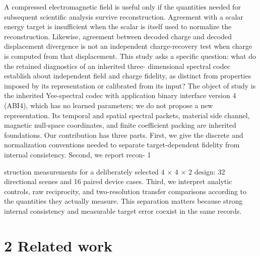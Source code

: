 \documentclass[11pt]{article}
\begin{document}
A compressed electromagnetic field is useful only if the quantities needed for subsequent scientific
analysis survive reconstruction. Agreement with a scalar energy target is insufficient when the
scalar is itself used to normalize the reconstruction. Likewise, agreement between decoded charge
and decoded displacement divergence is not an independent charge-recovery test when charge is
computed from that displacement.
This study asks a specific question: what do the retained diagnostics of an inherited three-
dimensional spectral codec establish about independent field and charge fidelity, as distinct from
properties imposed by its representation or calibrated from its input? The object of study is
the inherited Yee-spectral codec with application binary interface version 4 (ABI4), which has no
learned parameters; we do not propose a new representation. Its temporal and spatial spectral
packets, material side channel, magnetic null-space coordinates, and finite coefficient packing are
inherited foundations.
Our contribution has three parts. First, we give the discrete and normalization conventions
needed to separate target-dependent fidelity from internal consistency. Second, we report recon-
1

struction measurements for a deliberately selected 4 \ensuremath{\times} 4 \ensuremath{\times} 2 design: 32 directional scenes and
16 paired device cases. Third, we interpret analytic controls, raw reciprocity, and two-resolution
transfer comparisons according to the quantities they actually measure. This separation matters
because strong internal consistency and measurable target error coexist in the same records.

\section*{2 Related work}
\end{document}
